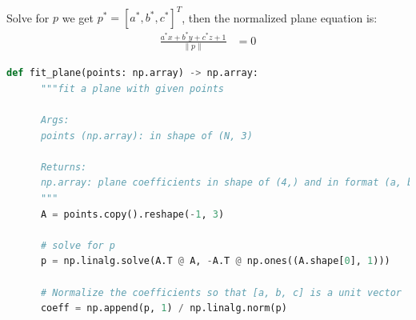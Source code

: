 \documentclass[conference,onecolumn]{IEEEtran}
\begin{document}
\begin{enumerate}[label=\arabic{enumi}.]
\begin{enumerate}
\begin{align*}
                        \end{align*}
                        Solve for $p$ we get $p^* = [a^*, b^*, c^*]^T$, then the normalized plane equation is:
                        \begin{align*}
                              \frac{a^* x + b^* y + c^* z + 1}{\|p\|} & = 0
                        \end{align*}
                        \begin{lstlisting}[language=Python]
def fit_plane(points: np.array) -> np.array:
      """fit a plane with given points

      Args:
      points (np.array): in shape of (N, 3)

      Returns:
      np.array: plane coefficients in shape of (4,) and in format (a, b, c, d), normalized so ||(a, b, c)|| = 1
      """
      A = points.copy().reshape(-1, 3)

      # solve for p
      p = np.linalg.solve(A.T @ A, -A.T @ np.ones((A.shape[0], 1)))

      # Normalize the coefficients so that [a, b, c] is a unit vector
      coeff = np.append(p, 1) / np.linalg.norm(p)


\end{lstlisting}
\end{enumerate}
\end{enumerate}
\end{document}
